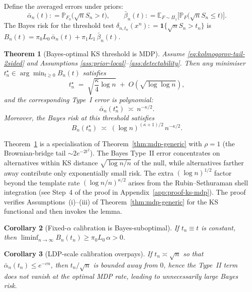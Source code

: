 \documentclass[11pt]{article}
\newcommand{\defeq}{\mathrel{\mathop:}=}
\newcommand{\E}{\mathbb{E}}
\newcommand{\rhotail}{\rho}  %
\newcommand{\1}{\mathbf{1}}
\newcommand{\PP}{\mathbb{P}}
\theoremstyle{plain}
\newtheorem{theorem}{Theorem}[section]
\newtheorem{corollary}[theorem]{Corollary}
\theoremstyle{definition}
\theoremstyle{remark}
\begin{document}
Define the averaged errors under priors:
\[
\bar\alpha_n(t)\defeq \PP_{F_0}\!\big(\sqrt{n}S_n>t\big),
\qquad
\bar\beta_n(t)\defeq
\E_{F\sim\Pi_1}\Big[\PP_F\!\big(\sqrt{n}S_n\le t\big)\Big].
\]
The Bayes risk for the threshold test $\delta_{n,t_n}(x^n)\defeq\1\{\sqrt{n}S_n>t_n\}$ is
$B_n(t)=\pi_0L_0\,\bar\alpha_n(t)+\pi_1L_1\,\bar\beta_n(t)$.

\begin{theorem}[Bayes-optimal KS threshold is MDP]\label{thm:ks-mdp}
Assume \eqref{eq:kolmogorov-tail-2sided} and Assumptions \ref{ass:prior-local}--\ref{ass:detectability}.
Then any minimiser $t_n^\star\in\arg\min_{t\ge 0} B_n(t)$ satisfies
\begin{equation}\label{eq:optimal-threshold}
t_n^\star \;=\; \sqrt{\frac{\kappa}{4}\log n}\;+\;O(\sqrt{\log\log n}),
\end{equation}
and the corresponding Type~I error is polynomial:
\begin{equation}\label{eq:type1-decay}
\bar\alpha_n(t_n^\star)\ \asymp\ n^{-\kappa/2}.
\end{equation}
Moreover, the Bayes risk at this threshold satisfies
\begin{equation}\label{eq:bayes-risk-rate}
B_n(t_n^\star)
\;\asymp\;
(\log n)^{(\kappa+1)/2}\, n^{-\kappa/2}.
\end{equation}
\end{theorem}

Theorem~\ref{thm:ks-mdp} is a specialisation of Theorem~\ref{thm:mdp-generic} with $\rhotail = 1$ (the Brownian-bridge tail $\sim 2e^{-2t^2}$).
The Bayes Type~II error concentrates on alternatives within KS distance $\sqrt{\log n/n}$ of the null, while alternatives farther away contribute only exponentially small risk.
The extra $(\log n)^{1/2}$ factor beyond the template rate $(\log n/n)^{\kappa/2}$ arises from the Rubin--Sethuraman shell integration (see Step~4 of the proof in Appendix~\ref{app:proof-ks-mdp}).
The proof verifies Assumptions~(i)--(iii) of Theorem~\ref{thm:mdp-generic} for the KS functional and then invokes the lemma.

\begin{corollary}[Fixed-$\alpha$ calibration is Bayes-suboptimal]\label{cor:fixed-alpha}
If $t_n\equiv t$ is constant, then $\liminf_{n\to\infty} B_n(t_n) \ge \pi_0L_0\,\alpha > 0$.
\end{corollary}

\begin{corollary}[LDP-scale calibration overpays]\label{cor:ldp-overpays}
If $t_n\asymp \sqrt{n}$ so that $\bar\alpha_n(t_n)\le e^{-cn}$, then $t_n/\sqrt{n}$ is bounded away from $0$, hence the Type~II term does not vanish at the optimal MDP rate, leading to unnecessarily large Bayes risk.
\end{corollary}
\end{document}
